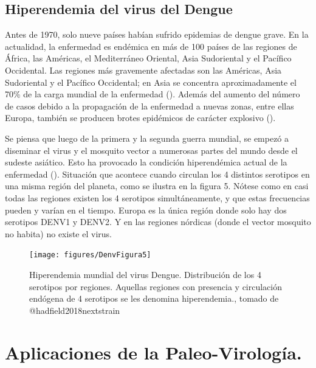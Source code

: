 \documentclass[
  12pt, krantz2,
  spanish,
]{krantz}
\begin{document}
\hypertarget{section}{%
\subsection{\texorpdfstring{\hfill\break
}{ }}\label{section}}

\hypertarget{hiperendemia-del-virus-del-dengue}{%
\subsection{Hiperendemia del virus del Dengue}\label{hiperendemia-del-virus-del-dengue}}

Antes de 1970, solo nueve países habían sufrido epidemias de dengue grave. En la actualidad, la enfermedad es endémica en más de 100 países de las regiones de África, las Américas, el Mediterráneo Oriental, Asia Sudoriental y el Pacífico Occidental. Las regiones más gravemente afectadas son las Américas, Asia Sudoriental y el Pacífico Occidental; en Asia se concentra aproximadamente el 70\% de la carga mundial de la enfermedad (\citet{whodenv}). Además del aumento del número de casos debido a la propagación de la enfermedad a nuevas zonas, entre ellas Europa, también se producen brotes epidémicos de carácter explosivo (\citet{hadfield2018nextstrain}).

Se piensa que luego de la primera y la segunda guerra mundial, se empezó a diseminar el virus y el mosquito vector a numerosas partes del mundo desde el sudeste asiático. Esto ha provocado la condición hiperendémica actual de la enfermedad (\citet{hadfield2018nextstrain}). Situación que acontece cuando circulan los 4 distintos serotipos en una misma región del planeta, como se ilustra en la figura 5. Nótese como en casi todas las regiones existen los 4 serotipos simultáneamente, y que estas frecuencias pueden y varían en el tiempo. Europa es la única región donde solo hay dos serotipos DENV1 y DENV2. Y en las regiones nórdicas (donde el vector mosquito no habita) no existe el virus.

\begin{figure}
\texttt{[image: figures/DenvFigura5]} \caption{Hiperendemia mundial del virus Dengue. Distribución de los 4 serotipos por regiones. Aquellas regiones con presencia y circulación endógena de 4 serotipos se les denomina hiperendemia., tomado de @hadfield2018nextstrain}\label{fig:DenvHyper}
\end{figure}

\hypertarget{paleovir}{%
\section{Aplicaciones de la Paleo-Virología.}\label{paleovir}}
\end{document}
